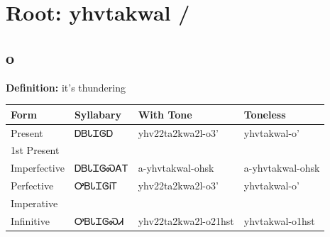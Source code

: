 \documentclass{article}%
\begin{document}
%
\normalsize%
\section*{Root: yhvtakwal / }%
\subsection*{o}%
\textbf{Definition: }%
it’s thundering%
\\[0.5em]%
\begin{tabular}{|l|l|l|l|}%
\hline%
\textbf{Form}&\textbf{Syllabary}&\textbf{With Tone}&\textbf{Toneless}\\%
\hline%
Present&ᎠᏴᏓᏆᎶᎠ&yhv22ta2kwa2l{-}o3'&yhvtakwal{-}o'\\%
1st Present&&&\\%
Imperfective&ᎠᏴᏓᏆᎶᏍᎪᎢ&a{-}yhvtakwal{-}ohsk&a{-}yhvtakwal{-}ohsk\\%
Perfective&ᎤᏴᏓᏆᎶᎥᎢ&yhv22ta2kwa2l{-}o3'&yhvtakwal{-}o'\\%
Imperative&&&\\%
Infinitive&ᎤᏴᏓᏆᎶᏍᏗ&yhv22ta2kwa2l{-}o21hst&yhvtakwal{-}o1hst\\%
\hline%
\end{tabular}%
\\[1em]%
\end{document}
